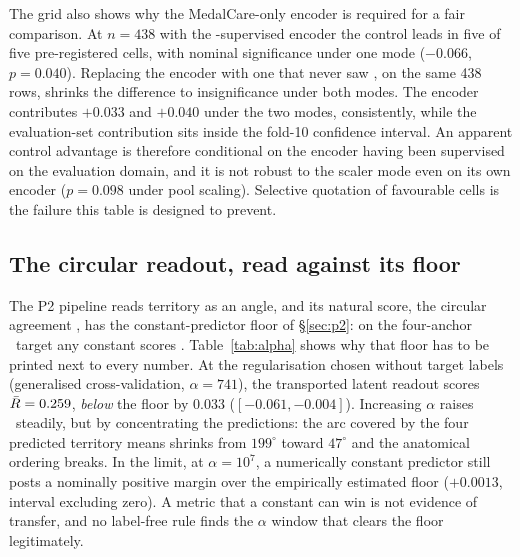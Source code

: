 The grid also shows why the MedalCare-only encoder is required for a fair comparison. At $n=438$ with the \ptbxl-supervised encoder the control leads in five of five pre-registered cells, with nominal significance under one mode ($-0.066$, $p=0.040$). Replacing the encoder with one that never saw \ptbxl, on the same 438 rows, shrinks the difference to insignificance under both modes. The encoder contributes $+0.033$ and $+0.040$ under the two modes, consistently, while the evaluation-set contribution sits inside the fold-10 confidence interval. An apparent control advantage is therefore conditional on the encoder having been supervised on the evaluation domain, and it is not robust to the scaler mode even on its own encoder ($p=0.098$ under pool scaling). Selective quotation of favourable cells is the failure this table is designed to prevent. 

\subsection{The circular readout, read against its floor}
\label{sec:floors}

The P2 pipeline reads territory as an angle, and its natural score, the circular agreement \circR, has the constant-predictor floor of \S\ref{sec:p2}: on the four-anchor \ptbxl\ target any constant scores \Rfloorptb. Table~\ref{tab:alpha} shows why that floor has to be printed next to every number. At the regularisation chosen without target labels (generalised cross-validation, $\alpha=741$), the transported latent readout scores $\bar{R} = 0.259$, \emph{below} the floor by $0.033$ ($[-0.061, -0.004]$). Increasing $\alpha$ raises \circR\ steadily, but by concentrating the predictions: the arc covered by the four predicted territory means shrinks from $199^\circ$ toward $47^\circ$ and the anatomical ordering breaks. In the limit, at $\alpha = 10^{7}$, a numerically constant predictor still posts a nominally positive margin over the empirically estimated floor ($+0.0013$, interval excluding zero). A metric that a constant can win is not evidence of transfer, and no label-free rule finds the $\alpha$ window that clears the floor legitimately. 

